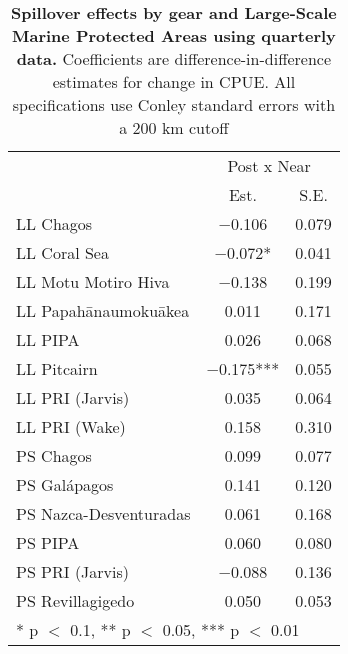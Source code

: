 \begin{table}

\caption{\label{tab:mpa_reg}\textbf{Spillover effects by gear and Large-Scale Marine Protected Areas using quarterly data.} Coefficients are
             difference-in-difference estimates for change in CPUE. All specifications use Conley standard errors with a 200 km cutoff}
\centering
\begin{tabular}[t]{lcc}
\toprule
\multicolumn{1}{c}{ } & \multicolumn{2}{c}{Post x Near} \\
\cmidrule(l{3pt}r{3pt}){2-3}
  & Est. & S.E.\\
\midrule
LL Chagos & \num{-0.106} & \num{0.079}\\
LL Coral Sea & \num{-0.072}* & \num{0.041}\\
LL Motu Motiro Hiva & \num{-0.138} & \num{0.199}\\
LL Papahānaumokuākea & \num{0.011} & \num{0.171}\\
LL PIPA & \num{0.026} & \num{0.068}\\
LL Pitcairn & \num{-0.175}*** & \num{0.055}\\
LL PRI (Jarvis) & \num{0.035} & \num{0.064}\\
LL PRI (Wake) & \num{0.158} & \num{0.310}\\
PS Chagos & \num{0.099} & \num{0.077}\\
PS Galápagos & \num{0.141} & \num{0.120}\\
PS Nazca-Desventuradas & \num{0.061} & \num{0.168}\\
PS PIPA & \num{0.060} & \num{0.080}\\
PS PRI (Jarvis) & \num{-0.088} & \num{0.136}\\
PS Revillagigedo & \num{0.050} & \num{0.053}\\
\bottomrule
\multicolumn{3}{l}{\rule{0pt}{1em}* p $<$ 0.1, ** p $<$ 0.05, *** p $<$ 0.01}\\
\end{tabular}
\end{table}
